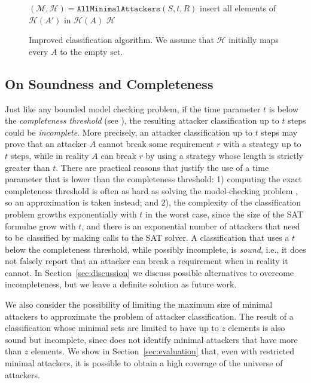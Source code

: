 {\begin{figure}[!t]
{\begin{algorithm}[H]
$(\mathcal{M},\mathcal{H})=\mathtt{AllMinimalAttackers}(S,t,R)$\;
{
	{
		{
			insert all elements of $\mathcal{H}(A')$ in $\mathcal{H}(A)$\;
		}
	 }
}
 \Return $\mathcal{H}$\;
 \caption{Improved classification algorithm. We assume that $\mathcal{H}$ initially maps every $A$ to the empty set.}
 \label{alg:GoodQuantification}
\end{algorithm}
}
\vspace{-0.5cm}
\end{figure}

\subsection{On Soundness and Completeness}
\label{sec:completeness}
Just like any bounded model checking problem, if the time parameter $t$ is below the \emph{completeness threshold} (see \cite{EfficientComputationOfRecurrenceDiameters}), the resulting attacker classification up to $t$ steps could be \emph{incomplete}. More precisely, an attacker classification up to $t$ steps may prove that an attacker $A$ cannot break some requirement $r$ with a strategy up to $t$ steps, while in reality $A$ can break $r$ by using a strategy whose length is strictly greater than $t$. There are practical reasons that justify the use of a time parameter that is lower than the completeness threshold: 1) computing the exact completeness threshold is often as hard as solving the model-checking problem \cite{HandbookOfModelChecking}, so an approximation is taken instead; and 2), the complexity of the classification problem growths exponentially with $t$ in the worst case, since the size of the SAT formulae grow with $t$, and there is an exponential number of attackers that need to be classified by making calls to the SAT solver. A classification that uses a $t$ below the completeness threshold, while possibly incomplete, is \emph{sound}, i.e., it does not falsely report that an attacker can break a requirement when in reality it cannot. In Section~\ref{sec:discussion} we discuss possible alternatives to overcome incompleteness, but we leave a definite solution as future work.

We also consider the possibility of limiting the maximum size of minimal attackers to approximate the problem of attacker classification. The result of a classification whose minimal sets are limited to have up to $z$ elements is also sound but incomplete, since does not identify minimal attackers that have more than $z$ elements. We show in Section~\ref{sec:evaluation} that, even with restricted minimal attackers, it is possible to obtain a high coverage of the universe of attackers.
 
}
